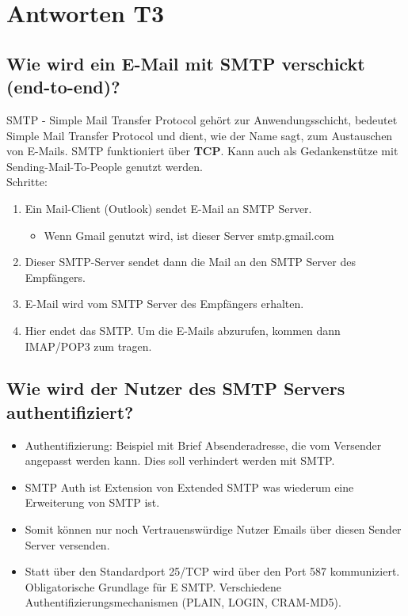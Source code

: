 \section{Antworten T3}
\subsection*{Wie wird ein E-Mail mit SMTP verschickt (end-to-end)?}
SMTP - Simple Mail Transfer Protocol gehört zur Anwendungsschicht, bedeutet Simple Mail Transfer Protocol und dient, wie der Name sagt, zum Austauschen von E-Mails. SMTP funktioniert über \textbf{TCP}. Kann auch als Gedankenstütze mit Sending-Mail-To-People genutzt werden.\\[1em]
Schritte:
\begin{enumerate}
    \item Ein Mail-Client (Outlook) sendet E-Mail an SMTP Server.
    \begin{itemize}
        \item Wenn Gmail genutzt wird, ist dieser Server smtp.gmail.com
    \end{itemize}
    \item Dieser SMTP-Server sendet dann die Mail an den SMTP Server des Empfängers.
    \item E-Mail wird vom SMTP Server des Empfängers erhalten.
    \item Hier endet das SMTP. Um die E-Mails abzurufen, kommen dann IMAP/POP3 zum tragen.
\end{enumerate}

\subsection*{Wie wird der Nutzer des SMTP Servers authentifiziert?}
\begin{itemize}
    \item Authentifizierung: Beispiel mit Brief Absenderadresse, die vom Versender angepasst werden kann. Dies soll verhindert werden mit SMTP.
    \item SMTP Auth ist Extension von Extended SMTP was wiederum eine Erweiterung von SMTP ist.
    \item Somit können nur noch Vertrauenswürdige Nutzer Emails über diesen Sender Server versenden.
    \item Statt über den Standardport 25/TCP wird über den Port 587 kommuniziert. Obligatorische Grundlage für E SMTP. Verschiedene Authentifizierungsmechanismen (PLAIN, LOGIN, CRAM-MD5).
\end{itemize}

